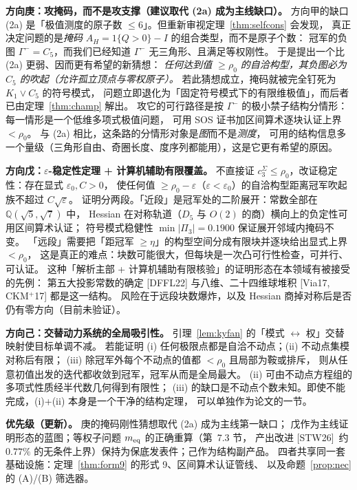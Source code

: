 \documentclass[UTF8,11pt]{ctexart}
\theoremstyle{definition}
\newcommand{\Q}{\mathbb{Q}}
\newcommand{\STW}{\textup{[STW26]}}
\begin{document}
\textbf{方向庚：攻掩码，而不是攻支撑（建议取代 (2a) 成为主线缺口）。}
方向甲的缺口 (2a) 是「极值测度的原子数 $\le6$」。但重新审视定理~\ref{thm:selfcons} 会发现，
真正决定问题的是\emph{掩码} $A_H=1\{Q>0\}-I$ 的组合类型，而不是原子个数：
冠军的负图 $\Gamma^-=C_5$，而我们已经知道 $\Gamma^-$ 无三角形、且满足等权刚性。
于是提出一个比 (2a) 更弱、因而更有希望的新猜想：
\emph{任何达到值 $\ge\rho_0$ 的自洽构型，其负图必为 $C_5$ 的吹起（允许孤立顶点与零权原子）。}
若此猜想成立，掩码就被完全钉死为 $K_1\vee C_5$ 的符号模式，
问题立即退化为「固定符号模式下的有限维极值」，而后者已由定理~\ref{thm:champ} 解出。
攻它的可行路径是按 $\Gamma^-$ 的极小禁子结构分情形：每一情形是一个低维多项式极值问题，
可用 SOS 证书加区间算术逐块认证上界 $<\rho_0$。
与 (2a) 相比，这条路的分情形对象是\emph{图}而不是\emph{测度}，
可用的结构信息多一个量级（三角形自由、奇圈长度、度序列都能用），这是它更有希望的原因。

\textbf{方向戊：$\varepsilon$-稳定性定理 + 计算机辅助有限覆盖。}
不直接证 $c_3^{\Sigma}\le\rho_0$，改证稳定性：存在显式 $\varepsilon_0,C>0$，
使任何值 $\ge\rho_0-\varepsilon$（$\varepsilon<\varepsilon_0$）的自洽构型距离冠军吹起族不超过 $C\sqrt\varepsilon$。
证明分两段。「近段」是冠军处的二阶展开：常数全部在 $\Q(\sqrt5,\sqrt7)$ 中，
Hessian 在对称轨道（$D_5$ 与 $O(2)$ 的商）横向上的负定性可用区间算术认证；
符号模式稳健性 $\min|\Pi_3|=0.1900$ 保证展开邻域内掩码不变。
「远段」需要把「距冠军 $\ge\eta$」的构型空间分成有限块并逐块给出显式上界 $<\rho_0$，
这是真正的难点：块数可能很大，但每块是一次凸可行性检查，可并行、可认证。
这种「解析主部 + 计算机辅助有限核验」的证明形态在本领域有被接受的先例：
第五大投影常数的确定 [DFFL22] 与八维、二十四维球堆积 [Via17, CKM$^+$17] 都是这一结构。
风险在于远段块数爆炸，以及 Hessian 商掉对称后是否仍有零方向（目前未验证）。

\textbf{方向己：交替动力系统的全局吸引性。}
引理~\ref{lem:kyfan} 的「模式 $\leftrightarrow$ 权」交替映射使目标单调不减。
若能证明 (i) 任何极限点都是自洽不动点；(ii) 不动点集模对称后有限；
(iii) 除冠军外每个不动点的值都 $<\rho_0$ 且局部为鞍或排斥，
则从任意初值出发的迭代都收敛到冠军，冠军从而是全局最大。
(ii) 可由不动点方程组的多项式性质经半代数几何得到有限性；
(iii) 的缺口是不动点个数未知。即使不能完成，(i)+(ii) 本身是一个干净的结构定理，
可以单独作为论文的一节。

\textbf{优先级（更新）。} 庚的掩码刚性猜想取代 (2a) 成为主线第一缺口；
戊作为主线证明形态的蓝图；等权子问题 $m_{\rm eq}$ 的正确重算（第~7.3 节，
产出改进 \STW\ 约 $0.77\%$ 的无条件上界）保持为保底发表件；己作为结构副产品。
四者共享同一套基础设施：定理~\ref{thm:form9} 的形式 9、区间算术认证管线、
以及命题~\ref{prop:nec} 的 (A)/(B) 筛选器。
\end{document}
